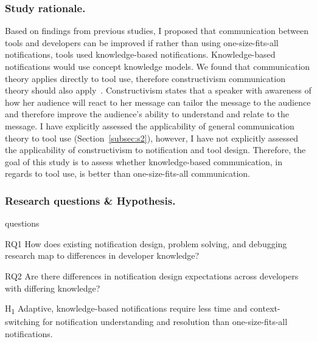 \documentclass{llncs}
\begin{document}
\subsubsection{Study rationale.}
Based on findings from previous studies, I proposed that communication between tools and developers can be improved if rather than using one-size-fits-all notifications, tools used knowledge-based notifications. Knowledge-based notifications would use concept knowledge models. We found that communication theory applies directly to tool use, therefore constructivism communication theory should also apply~\cite{griffin2011first}. Constructivism states that a speaker with awareness of how her audience will react to her message can tailor the message to the audience and therefore improve the audience's ability to understand and relate to the message. 
I have explicitly assessed the applicability of general communication theory to tool use (Section~\ref{subsec:s2}), however, I have not explicitly assessed the applicability of constructivism to notification and tool design. Therefore, the goal of this study is to assess whether knowledge-based communication, in regards to tool use, is better than one-size-fits-all communication.

\subsubsection{Research questions \& Hypothesis.}

\begin{labeling}{questions}
	\item [RQ1] How does existing notification design, problem solving, and debugging research map to differences in developer knowledge?
	\item [RQ2] Are there differences in notification design expectations across developers with differing knowledge?
	\item [H\textsubscript{1}] Adaptive, knowledge-based notifications require less time and context-switching for notification understanding and resolution than one-size-fits-all notifications.
\end{labeling}
\end{document}
